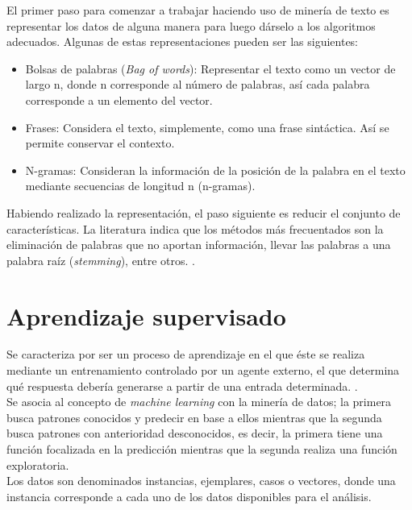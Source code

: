 	El primer paso para comenzar a trabajar haciendo uso de minería de texto es representar los datos de alguna manera para luego dárselo a los algoritmos adecuados. Algunas de estas representaciones pueden ser las siguientes:\\

	\begin{itemize}
	\item Bolsas de palabras (\textit{Bag of words}): Representar el texto como un vector de largo n, donde n corresponde al número de palabras, así cada palabra corresponde a un elemento del vector.
	\item Frases: Considera el texto, simplemente, como una frase sintáctica. Así se permite conservar el contexto.
	\item N-gramas: Consideran la información de la posición de la palabra en el texto mediante secuencias de longitud n (n-gramas). 
	\end{itemize}

	Habiendo realizado la representación, el paso siguiente es reducir el conjunto de características. La literatura indica que los métodos más frecuentados son la eliminación de palabras que no aportan información, llevar las palabras a una palabra raíz (\textit{stemming}), entre otros. \cite{DMPreprocessing}.\\

\section{Aprendizaje supervisado}
\label{sec:aprendSuperv}

Se caracteriza por ser un proceso de aprendizaje en el que éste se realiza mediante un entrenamiento controlado por un agente externo, el que determina qué respuesta debería generarse a partir de una entrada determinada. \cite{AprendizajeSupervisado}.\\

Se asocia al concepto de \textit{machine learning} con la minería de datos; la primera busca patrones conocidos y predecir en base a ellos mientras que la segunda busca patrones con anterioridad desconocidos, es decir, la primera tiene una función focalizada en la predicción mientras que la segunda realiza una función exploratoria.\\

Los datos son denominados instancias, ejemplares, casos o vectores, donde una instancia corresponde a cada uno de los datos disponibles para el análisis.\\

